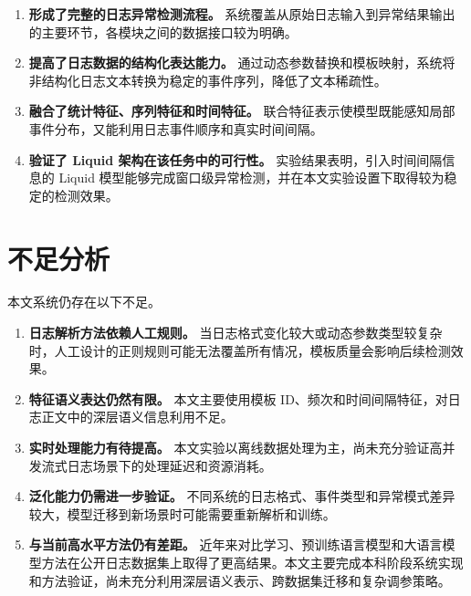 \begin{enumerate}
    \item \textbf{形成了完整的日志异常检测流程。} 系统覆盖从原始日志输入到异常结果输出的主要环节，各模块之间的数据接口较为明确。
    
    \item \textbf{提高了日志数据的结构化表达能力。} 通过动态参数替换和模板映射，系统将非结构化日志文本转换为稳定的事件序列，降低了文本稀疏性。
    
    \item \textbf{融合了统计特征、序列特征和时间特征。} 联合特征表示使模型既能感知局部事件分布，又能利用日志事件顺序和真实时间间隔。
    
    \item \textbf{验证了 Liquid 架构在该任务中的可行性。} 实验结果表明，引入时间间隔信息的 Liquid 模型能够完成窗口级异常检测，并在本文实验设置下取得较为稳定的检测效果。
\end{enumerate}

\section{不足分析}

本文系统仍存在以下不足。

\begin{enumerate}
    \item \textbf{日志解析方法依赖人工规则。} 当日志格式变化较大或动态参数类型较复杂时，人工设计的正则规则可能无法覆盖所有情况，模板质量会影响后续检测效果。
    
    \item \textbf{特征语义表达仍然有限。} 本文主要使用模板 ID、频次和时间间隔特征，对日志正文中的深层语义信息利用不足。
    
    \item \textbf{实时处理能力有待提高。} 本文实验以离线数据处理为主，尚未充分验证高并发流式日志场景下的处理延迟和资源消耗。
    
    \item \textbf{泛化能力仍需进一步验证。} 不同系统的日志格式、事件类型和异常模式差异较大，模型迁移到新场景时可能需要重新解析和训练。
    
    \item \textbf{与当前高水平方法仍有差距。} 近年来对比学习、预训练语言模型和大语言模型方法在公开日志数据集上取得了更高结果。本文主要完成本科阶段系统实现和方法验证，尚未充分利用深层语义表示、跨数据集迁移和复杂调参策略。
\end{enumerate}

